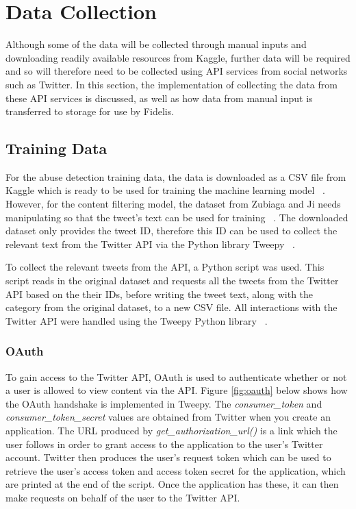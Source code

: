 \section{Data Collection}
Although some of the data will be collected through manual inputs and downloading readily available resources from Kaggle, further data will be required and so will therefore need to be collected using API services from social networks such as Twitter. In this section, the implementation of collecting the data from these API services is discussed, as well as how data from manual input is transferred to storage for use by Fidelis.

\subsection{Training Data} \label{sec:training-data}
For the abuse detection training data, the data is downloaded as a CSV file from Kaggle which is ready to be used for training the machine learning model ~\cite{Kaggle:Dataset}. However, for the content filtering model, the dataset from Zubiaga and Ji needs manipulating so that the tweet's text can be used for training ~\cite{Zubiaga:Tweets}. The downloaded dataset only provides the tweet ID, therefore this ID can be used to collect the relevant text from the Twitter API via the Python library Tweepy ~\cite{Tweepy}.

To collect the relevant tweets from the API, a Python script was used. This script reads in the original dataset and requests all the tweets from the Twitter API based on the their IDs, before writing the tweet text, along with the category from the original dataset, to a new CSV file. All interactions with the Twitter API were handled using the Tweepy Python library ~\cite{Tweepy}. 

\subsubsection{OAuth}
To gain access to the Twitter API, OAuth is used to authenticate whether or not a user is allowed to view content via the API. Figure \ref{fig:oauth} below shows how the OAuth handshake is implemented in Tweepy. The \textit{consumer\_token} and \textit{consumer\_token\_secret} values are obtained from Twitter when you create an application. The URL produced by \textit{get\_authorization\_url()} is a link which the user follows in order to grant access to the application to the user's Twitter account. Twitter then produces the user's request token which can be used to retrieve the user's access token and access token secret for the application, which are printed at the end of the script. Once the application has these, it can then make requests on behalf of the user to the Twitter API.

